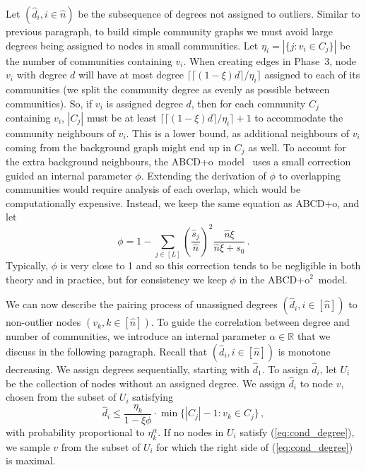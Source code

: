 \documentclass[review,los,12pt]{ryethesis}
\newcommand{\R}{{\mathbb R}}
\newcommand{\abcdo}{{ABCD+o}}
\newcommand{\abcdoo}{{ABCD+o$^2$}}
\begin{document}
Let $(\hat{d}_i , i \in \hat{n})$ be the subsequence of degrees not assigned to outliers.
Similar to previous paragraph, to build simple community graphs we must avoid large degrees being assigned to nodes in small communities.
Let $\eta_i = |\{j: v_i \in C_j\}|$ be the number of communities containing $v_i$.
When creating edges in Phase~3, node $v_i$ with degree $d$ will have at most degree $\Big\lceil \lceil (1-\xi) d \rceil / \eta_i \Big\rceil$ assigned to each of its communities (we split the community degree as evenly as possible between communities).
So, if $v_i$ is assigned degree $d$, then for each community $C_j$ containing $v_i$, $|C_j|$ must be at least $\Big\lceil \lceil(1-\xi) d \rceil / \eta_i \Big\rceil + 1$ to accommodate the community neighbours of $v_i$.
This is a lower bound, as additional neighbours of $v_i$ coming from the background graph might end up in $C_j$ as well.
To account for the extra background neighbours, the \abcdo\ model~\cite{abcd} uses a small correction guided an internal parameter $\phi$.
Extending the derivation of $\phi$ to overlapping communities would require analysis of each overlap, which would be computationally expensive.
Instead, we keep the same equation as \abcdo, and let
\[
\phi = 1 - \sum_{j \in [L]} \left( \frac {\hat{s}_j}{\hat{n}} \right)^2 \frac { \hat{n} \xi }{ \hat{n} \xi + s_0 } \,.
\]
Typically, $\phi$ is very close to 1 and so this correction tends to be negligible in both theory and in practice, but for consistency we keep $\phi$ in the \abcdoo\ model.

We can now describe the pairing process of unassigned degrees $(\hat{d}_i, i \in [\hat{n}])$ to non-outlier nodes $(v_k, k \in [\hat{n}])$.
To guide the correlation between degree and number of communities, we introduce an internal parameter $\alpha \in \R$ that we discuss in the following paragraph.
Recall that $(\hat{d}_i, i \in [\hat{n}])$ is monotone decreasing.
We assign degrees sequentially, starting with $\hat{d}_1$.
To assign $\hat{d}_i$, let $U_i$ be the collection of nodes without an assigned degree.
We assign $\hat{d}_i$ to node $v$, chosen from the subset of $U_i$ satisfying 
\begin{equation}\label{eq:cond_degree}
\hat{d}_i \leq \frac{\eta_k}{1 - \xi \phi} \cdot \min \Big\{ |C_j|-1 : v_k \in C_j \Big\} \,,
\end{equation}
with probability proportional to $\eta_k^{\alpha}$.
If no nodes in $U_i$ satisfy (\ref{eq:cond_degree}), we sample $v$ from the subset of $U_i$ for which the right side of (\ref{eq:cond_degree}) is maximal. 
\end{document}

